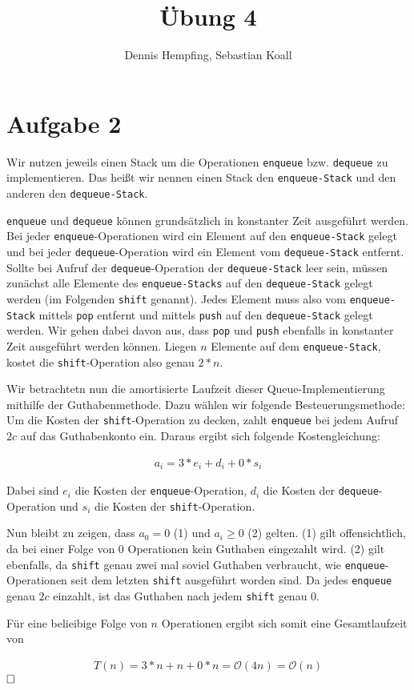 \documentclass[12pt]{scrartcl}%
\theoremstyle{nonumberplain}
\newcommand{\bO}[1]{\mathcal O(#1)}
\newcommand{\code}[1]{\lstinline[basicstyle=\ttfamily\color{black}]{#1}}
\begin{document}
\author{Dennis Hempfing, Sebastian Koall}
\title{Übung 4}
\date{} 
\pagestyle{myheadings}

\maketitle %

\section*{Aufgabe 2}

Wir nutzen jeweils einen Stack um die Operationen \code{enqueue} bzw. \code{dequeue} zu implementieren. Das heißt wir nennen einen Stack den \code{enqueue-Stack} und den anderen den \code{dequeue-Stack}.

\code{enqueue} und \code{dequeue} können grundsätzlich in konstanter Zeit ausgeführt werden. Bei jeder \code{enqueue}-Operationen wird ein Element auf den \code{enqueue-Stack} gelegt und bei jeder \code{dequeue}-Operation wird ein Element vom \code{dequeue-Stack} entfernt. Sollte bei Aufruf der \code{dequeue}-Operation der \code{dequeue-Stack} leer sein, müssen zunächst alle Elemente des \code{enqueue-Stacks} auf den \code{dequeue-Stack} gelegt werden (im Folgenden \code{shift} genannt). Jedes Element muss also vom \code{enqueue-Stack} mittels \code{pop} entfernt und mittels \code{push} auf den \code{dequeue-Stack} gelegt werden. Wir gehen dabei davon aus, dass \code{pop} und \code{push} ebenfalls in konstanter Zeit ausgeführt werden können. Liegen $n$ Elemente auf dem \code{enqueue-Stack}, kostet die \code{shift}-Operation also genau $2*n$.

Wir betrachtetn nun die amortisierte Laufzeit dieser Queue-Implementierung mithilfe der Guthabenmethode. Dazu wählen wir folgende Besteuerungsmethode: Um die Kosten der \code{shift}-Operation zu decken, zahlt \code{enqueue} bei jedem Aufruf $2c$ auf das Guthabenkonto ein. Daraus ergibt sich folgende Kostengleichung: 

\begin{align*}
	a_i = 3*e_i + d_i + 0*s_i
\end{align*}

Dabei sind $e_i$ die Kosten der \code{enqueue}-Operation, $d_i$ die Kosten der \code{dequeue}-Operation und $s_i$ die Kosten der \code{shift}-Operation.

Nun bleibt zu zeigen, dass $a_0 = 0$ (1) und $a_i \ge 0$ (2) gelten. (1) gilt offensichtlich, da bei einer Folge von 0 Operationen kein Guthaben eingezahlt wird. (2) gilt ebenfalls, da \code{shift} genau zwei mal soviel Guthaben verbraucht, wie \code{enqueue}-Operationen seit dem letzten \code{shift} ausgeführt worden sind. Da jedes \code{enqueue} genau $2c$ einzahlt, ist das Guthaben nach jedem \code{shift} genau 0.

Für eine belieibige Folge von $n$ Operationen ergibt sich somit eine Gesamtlaufzeit von

\begin{align*}
	T(n) = 3*n + n + 0*n = \bO{4n} = \bO{n}
\end{align*}
$\hfill \square$
\end{document}
